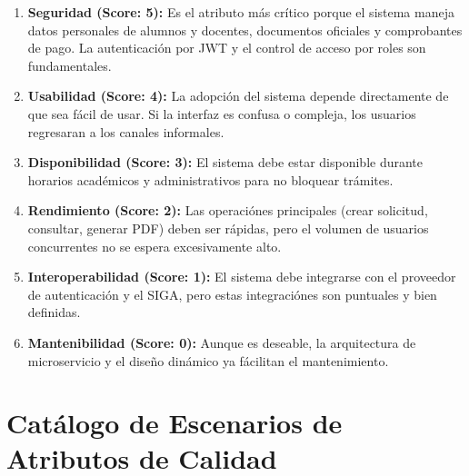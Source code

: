 \begin{enumerate}
    \item \textbf{Seguridad (Score: 5):} Es el atributo más crítico porque el sistema maneja datos personales de alumnos y docentes, documentos oficiales y comprobantes de pago. La autenticación por JWT y el control de acceso por roles son fundamentales.

    \item \textbf{Usabilidad (Score: 4):} La adopción del sistema depende directamente de que sea fácil de usar. Si la interfaz es confusa o compleja, los usuarios regresaran a los canales informales.

    \item \textbf{Disponibilidad (Score: 3):} El sistema debe estar disponible durante horarios académicos y administrativos para no bloquear trámites.

    \item \textbf{Rendimiento (Score: 2):} Las operaciónes principales (crear solicitud, consultar, generar PDF) deben ser rápidas, pero el volumen de usuarios concurrentes no se espera excesivamente alto.

    \item \textbf{Interoperabilidad (Score: 1):} El sistema debe integrarse con el proveedor de autenticación y el SIGA, pero estas integraciónes son puntuales y bien definidas.

    \item \textbf{Mantenibilidad (Score: 0):} Aunque es deseable, la arquitectura de microservicio y el diseño dinámico ya fácilitan el mantenimiento.
\end{enumerate}

\section{Catálogo de Escenarios de Atributos de Calidad}

